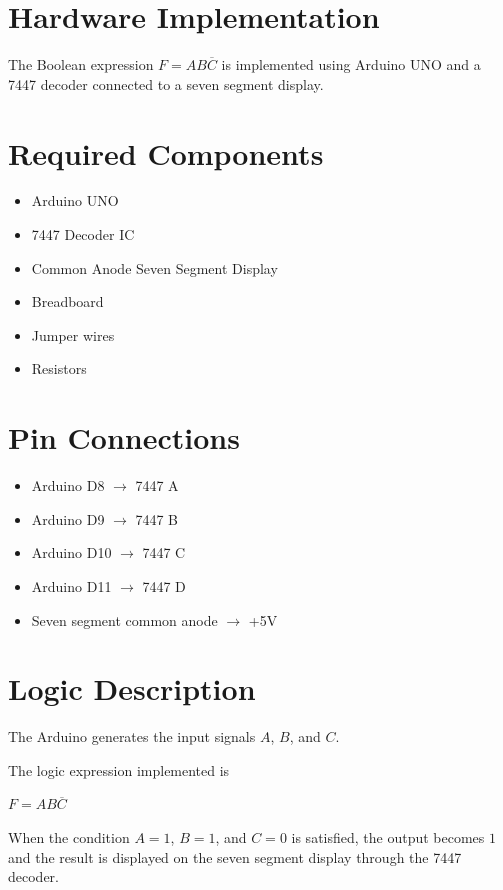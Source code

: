 \documentclass{article}
\begin{document}
\section*{Hardware Implementation}

The Boolean expression $F = AB\overline{C}$ is implemented using Arduino UNO and a 7447 decoder connected to a seven segment display.

\section*{Required Components}

\begin{itemize}
\item Arduino UNO
\item 7447 Decoder IC
\item Common Anode Seven Segment Display
\item Breadboard
\item Jumper wires
\item Resistors
\end{itemize}

\section*{Pin Connections}

\begin{itemize}
\item Arduino D8 $\rightarrow$ 7447 A
\item Arduino D9 $\rightarrow$ 7447 B
\item Arduino D10 $\rightarrow$ 7447 C
\item Arduino D11 $\rightarrow$ 7447 D
\item Seven segment common anode $\rightarrow$ +5V
\end{itemize}

\section*{Logic Description}

The Arduino generates the input signals $A$, $B$, and $C$.

The logic expression implemented is

$F = AB\overline{C}$

When the condition $A=1$, $B=1$, and $C=0$ is satisfied, the output becomes $1$ and the result is displayed on the seven segment display through the 7447 decoder.
\end{document}

